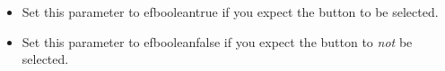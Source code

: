 \begin{itemize}
\item Set this parameter to \jb{}efbooleantrue{} if you expect the button to be  selected.
\item Set this parameter to \jb{}efbooleanfalse{} if you expect the button to \emph{not} be selected.
\end{itemize}

